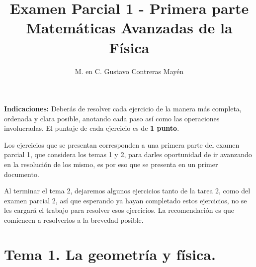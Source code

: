 \documentclass[12pt]{article}
\title{Examen Parcial 1 - Primera parte \\ \large {Matemáticas Avanzadas de la Física}  \vspace{-3ex}}
\author{M. en C. Gustavo Contreras Mayén}
\date{ }
\begin{document}
\vspace{-4cm}
\maketitle
\fontsize{14}{14}\selectfont

\textbf{Indicaciones: } Deberás de resolver cada ejercicio de la manera más completa, ordenada y clara posible, anotando cada paso así como las operaciones involucradas. El puntaje de cada ejercicio es de \textbf{1 punto}.
\par
Los ejercicios que se presentan corresponden a una primera parte del examen parcial 1, que considera los temas 1 y 2, para darles oportunidad de ir avanzando en la resolución de los mismo, es por eso que se presenta en un primer documento.
\par
Al terminar el tema 2, dejaremos algunos ejercicios tanto de la tarea 2, como del examen parcial 2, así que esperando ya hayan completado estos ejercicios, no se les cargará el trabajo para resolver esos ejercicios. La recomendación es que comiencen a resolverlos a la brevedad posible.

\section{Tema 1. La geometría y física.}
\end{document}
